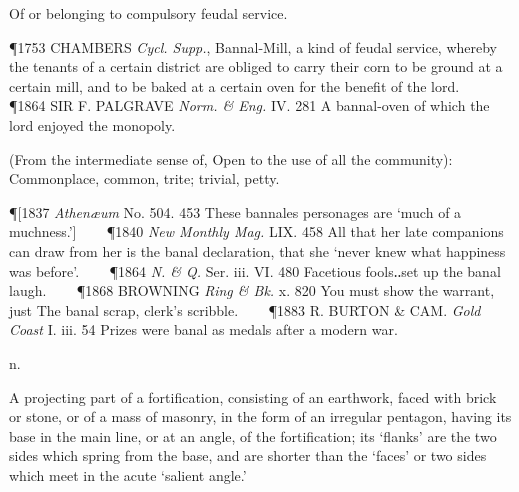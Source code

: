 \begin{description}[wide, labelwidth=!, labelindent=0pt]
\noindent {}


\vspace{-0.3cm}

\begin{myenumerate}
 Of or belonging to compulsory feudal service.

\P 1753 CHAMBERS  \textit{Cycl. Supp.}, Bannal-Mill, a kind of feudal service, whereby the tenants of a certain district are obliged to carry their corn to be ground at a certain mill, and to be baked at a certain oven for the benefit of the lord.    
\P 1864 SIR F. PALGRAVE  \textit{Norm. \& Eng.} IV. 281 A bannal-oven of which the lord enjoyed the monopoly.

 (From the intermediate sense of, Open to the use of all the community): Commonplace, common, trite; trivial, petty.

\P [1837 \textit{Athenæum}  No. 504. 453 These bannales personages are ‘much of a muchness.’]    
\P 1840 \textit{New Monthly Mag.} LIX. 458 All that her late companions can draw from her is the banal declaration, that she ‘never knew what happiness was before’.    
\P 1864 \textit{N. \& Q.}  Ser. iii. VI. 480 Facetious fools‥set up the banal laugh.    
\P 1868 BROWNING  \textit{Ring \& Bk.} x. 820 You must show the warrant, just The banal scrap, clerk's scribble.    
\P 1883 R. BURTON \& CAM. \textit{Gold Coast} I. iii. 54 Prizes were banal as medals after a modern war.
\end{myenumerate}


 n.

\noindent {}

\vspace{-0.3cm}

\begin{myenumerate}

 A projecting part of a fortification, consisting of an earthwork, faced with brick or stone, or of a mass of masonry, in the form of an irregular pentagon, having its base in the main line, or at an angle, of the fortification; its ‘flanks’ are the two sides which spring from the base, and are shorter than the ‘faces’ or two sides which meet in the acute ‘salient angle.’


\end{myenumerate}
\end{description}
